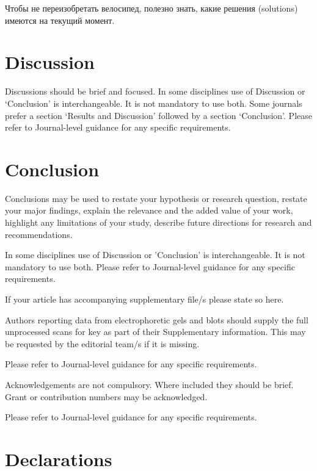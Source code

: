 \documentclass[pdflatex,sn-mathphys-num]{sn-jnl}%
\theoremstyle{thmstyleone}%
\theoremstyle{thmstyletwo}%
\theoremstyle{thmstylethree}%
\begin{document}
Чтобы не переизобретать велосипед, полезно знать, какие решения (solutions) имеются на текущий момент.

\section{Discussion}\label{sec12}

Discussions should be brief and focused. In some disciplines use of Discussion or `Conclusion' is interchangeable. It is not mandatory to use both. Some journals prefer a section `Results and Discussion' followed by a section `Conclusion'. Please refer to Journal-level guidance for any specific requirements. 

\section{Conclusion}\label{sec13}

Conclusions may be used to restate your hypothesis or research question, restate your major findings, explain the relevance and the added value of your work, highlight any limitations of your study, describe future directions for research and recommendations. 

In some disciplines use of Discussion or 'Conclusion' is interchangeable. It is not mandatory to use both. Please refer to Journal-level guidance for any specific requirements. 

\backmatter


If your article has accompanying supplementary file/s please state so here. 

Authors reporting data from electrophoretic gels and blots should supply the full unprocessed scans for key as part of their Supplementary information. This may be requested by the editorial team/s if it is missing.

Please refer to Journal-level guidance for any specific requirements.


Acknowledgements are not compulsory. Where included they should be brief. Grant or contribution numbers may be acknowledged.

Please refer to Journal-level guidance for any specific requirements.

\section*{Declarations}
\end{document}

